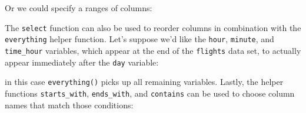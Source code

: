 \documentclass[]{tufte-book}
\newenvironment{Shaded}{\begin{snugshade}}{\end{snugshade}}
\newcommand{\KeywordTok}[1]{\textcolor[rgb]{0.13,0.29,0.53}{\textbf{{#1}}}}
\newcommand{\StringTok}[1]{\textcolor[rgb]{0.31,0.60,0.02}{{#1}}}
\newcommand{\NormalTok}[1]{{#1}}
\begin{document}
\begin{Shaded}
\end{Shaded}

Or we could specify a ranges of columns:

\begin{Shaded}
\end{Shaded}

The \texttt{select} function can also be used to reorder columns in
combination with the \texttt{everything} helper function. Let's suppose
we'd like the \texttt{hour}, \texttt{minute}, and \texttt{time\_hour}
variables, which appear at the end of the \texttt{flights} data set, to
actually appear immediately after the \texttt{day} variable:

\begin{Shaded}
\end{Shaded}

in this case \texttt{everything()} picks up all remaining variables.
Lastly, the helper functions \texttt{starts\_with}, \texttt{ends\_with},
and \texttt{contains} can be used to choose column names that match
those conditions:

\begin{Shaded}
\end{Shaded}
\end{document}
